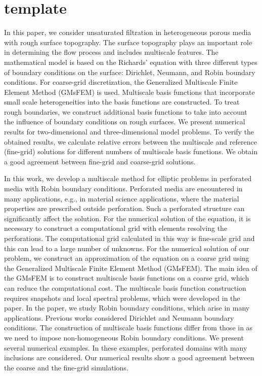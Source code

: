 \documentclass{aip-cp}
\begin{document}
\section{template}
In this paper, we consider unsaturated filtration in heterogeneous porous media with rough surface topography. The surface topography plays an important role in determining the flow process and includes multiscale features. 
The mathematical model is based on the Richards’ equation with three different types of boundary conditions on the surface: Dirichlet, Neumann, and Robin boundary conditions. 
For coarse-grid discretization, the Generalized Multiscale Finite Element Method (GMsFEM) is used. Multiscale basis functions that incorporate small scale heterogeneities into the basis functions are constructed. 
To treat rough boundaries, we construct additional basis functions to take into account the influence of boundary conditions on rough surfaces. 
We present numerical results for two-dimensional and three-dimensional model problems. 
To verify the obtained results, we calculate relative errors between the multiscale and reference (fine-grid) solutions for different numbers of multiscale basis functions. We obtain a good agreement between fine-grid and coarse-grid solutions.

In this work, we develop a multiscale method for elliptic problems in perforated media with Robin boundary conditions. 
Perforated media are encountered in many applications, e.g., in material science applications, where the material properties are prescribed outside perforation. 
Such a perforated structure can significantly affect the solution. 
For the numerical solution of the equation, it is necessary to construct a computational grid with elements resolving the perforations.
The computational grid calculated in this way is fine-scale grid and this can lead to a large number of unknowns. For the numerical solution of our problem, we construct an approximation of the equation on a coarse grid using the Generalized Multiscale Finite Element Method (GMsFEM). 
The main idea of the GMsFEM is to construct multiscale basis functions on a coarse grid, which can reduce the computational cost. 
The multiscale basis function construction requires snapshots and local spectral problems, which were developed in the paper. 
In the paper, we study Robin boundary conditions, which arise in many applications. 
Previous works \cite{b8} considered Dirichlet and Neumann boundary conditions. 
The construction of multiscale basis functions differ from those in \cite{b8,b9} as we need to impose non-homogeneous Robin boundary conditions. We present several numerical examples. 
In these examples, perforated domains with many inclusions are considered. Our numerical results show a good agreement between the coarse and the fine-grid simulations.
\end{document}
